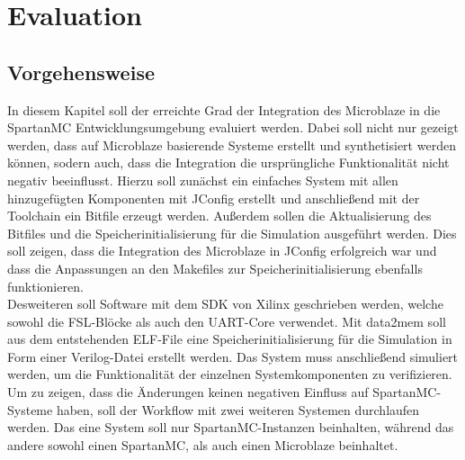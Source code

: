 \chapter{Evaluation}
\section{Vorgehensweise}
In diesem Kapitel soll der erreichte Grad der Integration des Microblaze in die SpartanMC Entwicklungsumgebung evaluiert werden. Dabei soll nicht nur gezeigt werden, dass auf Microblaze basierende Systeme erstellt und synthetisiert werden können, sodern auch, dass die Integration die ursprüngliche Funktionalität nicht negativ beeinflusst. Hierzu soll zunächst ein einfaches System mit allen hinzugefügten Komponenten mit JConfig erstellt und anschließend mit der Toolchain ein Bitfile erzeugt werden. Außerdem sollen die Aktualisierung des Bitfiles und die Speicherinitialisierung für die Simulation ausgeführt werden. Dies soll zeigen, dass die Integration des Microblaze in JConfig erfolgreich war und dass die Anpassungen an den Makefiles zur Speicherinitialisierung ebenfalls funktionieren.\\
Desweiteren soll Software mit dem SDK von Xilinx geschrieben werden, welche sowohl die FSL-Blöcke als auch den UART-Core verwendet. Mit data2mem soll aus dem entstehenden ELF-File eine Speicherinitialisierung für die Simulation in Form einer Verilog-Datei erstellt werden. Das System muss anschließend simuliert werden, um die Funktionalität der einzelnen Systemkomponenten zu verifizieren.\\
Um zu zeigen, dass die Änderungen keinen negativen Einfluss auf SpartanMC-Systeme haben, soll der Workflow mit zwei weiteren Systemen durchlaufen werden. Das eine System soll nur SpartanMC-Instanzen beinhalten, während das andere sowohl einen SpartanMC, als auch einen Microblaze beinhaltet.
